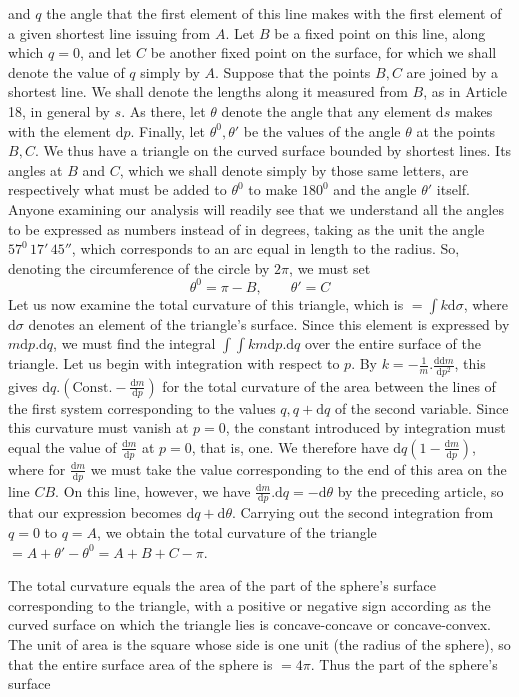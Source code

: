 %
and \(q\) the angle that the first element of this line makes with the first element of a given shortest line issuing from \(A\). Let \(B\) be a fixed point on this line, along which \(q=0\), and let \(C\) be another fixed point on the surface, for which we shall denote the value of \(q\) simply by \(A\). Suppose that the points \(B,C\) are joined by a shortest line. We shall denote the lengths along it measured from \(B\), as in Article 18, in general by \(s\). As there, let \(\theta\) denote the angle that any element \(\mathrm{d}s\) makes with the element \(\mathrm{d}p\). Finally, let \(\theta^0,\theta'\) be the values of the angle \(\theta\) at the points \(B,C\). We thus have a triangle on the curved surface bounded by shortest lines. Its angles at \(B\) and \(C\), which we shall denote simply by those same letters, are respectively what must be added to \(\theta^0\) to make \(180^0\) and the angle \(\theta'\) itself. Anyone examining our analysis will readily see that we understand all the angles to be expressed as numbers instead of in degrees, taking as the unit the angle \(57^0\,17'\,45''\), which corresponds to an arc equal in length to the radius. So, denoting the circumference of the circle by \(2\pi\), we must set
\[
\theta^0=\pi-B,\qquad\theta'=C
\]
Let us now examine the total curvature of this triangle, which is \(=\int k\mathrm{d}\sigma\), where \(\mathrm{d}\sigma\) denotes an element of the triangle’s surface. Since this element is expressed by \(m\mathrm{d}p\mathord{.}\mathrm{d}q\), we must find the integral \(\int\!\int km\mathrm{d}p\mathord{.}\mathrm{d}q\) over the entire surface of the triangle. Let us begin with integration with respect to \(p\). By \(k=-\frac{1}{m}\mathord{.}\frac{\mathrm{d}\mathrm{d}m}{\mathrm{d}p^2}\), this gives \(\mathrm{d}q\mathord{.}(\mathrm{Const.}-\frac{\mathrm{d}m}{\mathrm{d}p})\) for the total curvature of the area between the lines of the first system corresponding to the values \(q,q+\mathrm{d}q\) of the second variable. Since this curvature must vanish at \(p=0\), the constant introduced by integration must equal the value of \(\frac{\mathrm{d}m}{\mathrm{d}p}\) at \(p=0\), that is, one. We therefore have \(\mathrm{d}q(1-\frac{\mathrm{d}m}{\mathrm{d}p})\), where for \(\frac{\mathrm{d}m}{\mathrm{d}p}\) we must take the value corresponding to the end of this area on the line \(CB\). On this line, however, we have \(\frac{\mathrm{d}m}{\mathrm{d}p}\mathord{.}\mathrm{d}q=-\mathrm{d}\theta\) by the preceding article, so that our expression becomes \(\mathrm{d}q+\mathrm{d}\theta\). Carrying out the second integration from \(q=0\) to \(q=A\), we obtain the total curvature of the triangle \(=A+\theta'-\theta^0=A+B+C-\pi\).

The total curvature equals the area of the part of the sphere’s surface corresponding to the triangle, with a positive or negative sign according as the curved surface on which the triangle lies is concave-concave or concave-convex. The unit of area is the square whose side is one unit (the radius of the sphere), so that the entire surface area of the sphere is \(=4\pi\). Thus the part of the sphere’s surface

